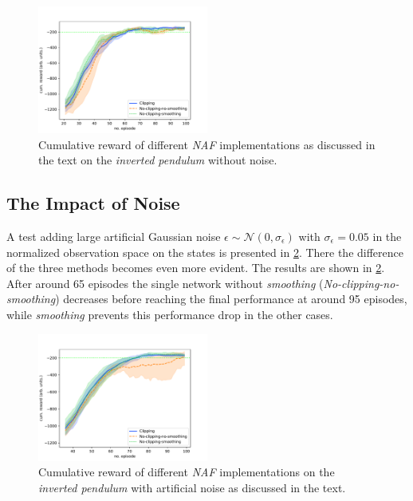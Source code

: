 \documentclass[
reprint,nofootinbib,
amsmath,amssymb,amsfonts,clevref,
aps,
prstab,
]{revtex4-2}
\begin{document}
	\begin{figure}[!h]
		\centering
		\includegraphics*[width=0.5\textwidth]{Figures/Comparison_naf}
		\caption{Cumulative reward of different \emph{NAF} implementations as discussed in the text on the \emph{inverted pendulum} without noise.}
		\label{fig:comparsion_smoothing_small}
	\end{figure}
	
	
	
	
	
	\subsection{The Impact of Noise}\label{appendix:The impact of noise}
	A test adding large artificial Gaussian noise $\epsilon \sim \mathcal{N}(0, \sigma_\epsilon)$ with $\sigma_\epsilon=0.05$ in the normalized observation space on the states is presented in \cref{fig:comparsion_noise}. There the difference of the three methods becomes even more evident. The results are shown in \cref{fig:comparsion_noise}. After around 65 episodes the single network without \emph{smoothing} (\emph{No-clipping-no-smoothing}) decreases before reaching the final performance at around 95 episodes, while  \emph{smoothing} prevents this performance drop in the other cases. 
	\begin{figure}
		\centering
		\includegraphics*[width=0.5\textwidth]{Figures/Comparison_noise}
		\caption{Cumulative reward of different \emph{NAF} implementations on the \emph{inverted pendulum} with artificial noise as discussed in the text.}
		\label{fig:comparsion_noise}
	\end{figure}
\end{document}
